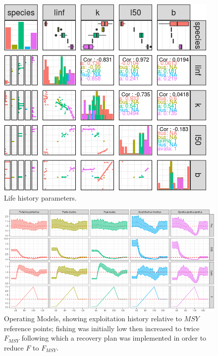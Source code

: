 \documentclass[12pt,doublespacing,a4paper]{ouparticle}
\begin{document}
\newpage
\begin{figure}[h]
\centering
%
\includegraphics[width=\textwidth]{roc-cor-1.png}
\caption{Life history parameters.}
\label{fig:cor}
\end{figure}

\newpage
\begin{figure}[h]
\centering
\includegraphics[width=\textwidth]{roc-ts-1.png}
\caption{Operating Models, showing exploitation history relative to $MSY$ reference points; fishing was initially low then increased to twice $F_{MSY}$ following which a recovery plan was implemented in order to reduce $F$ to $F_{MSY}$.}
\label{fig:oms}
\end{figure}

\end{document}
